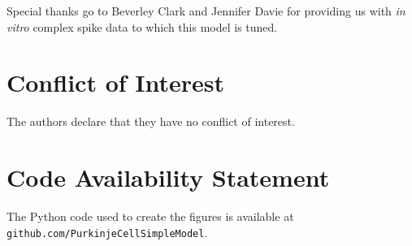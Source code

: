 \documentclass[twocolumn]{svjour3}          %
\begin{document}
\begin{acknowledgements}
Special thanks go to Beverley Clark and Jennifer Davie for providing
us with \textit{in vitro} complex spike data to which this model is
tuned.
\end{acknowledgements}

\section*{Conflict of Interest}
The authors declare that they have no conflict of interest.

\section*{Code Availability Statement}
The Python code used to create the figures is available at \texttt{github.com/PurkinjeCellSimpleModel}.



\end{document}
